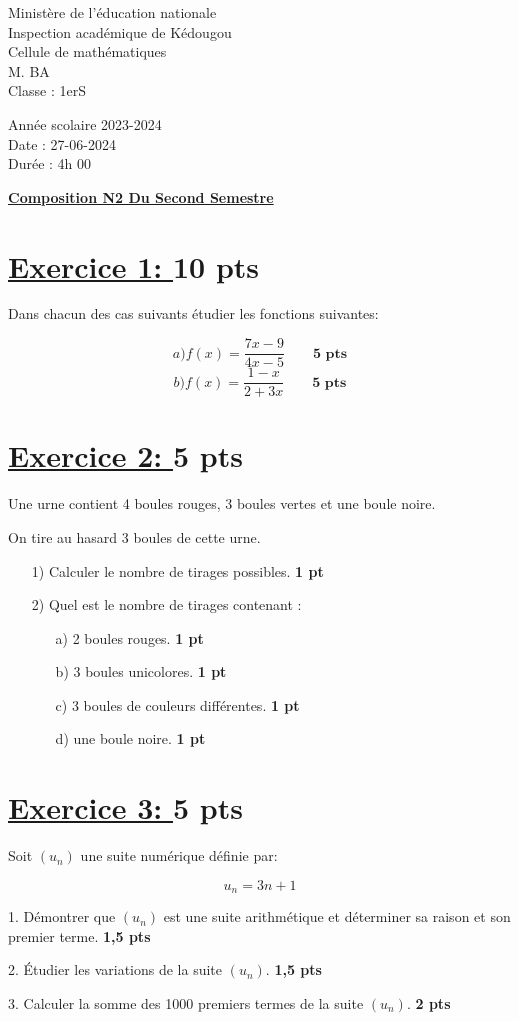 \documentclass[12pt]{article}
\begin{document}
\begin{minipage}{0.5\textwidth}
	Ministère de l'éducation nationale  \\
	Inspection académique de Kédougou   \\
	Cellule de mathématiques            \\
	M. BA\\
	Classe : 1erS
\end{minipage}
\begin{minipage}{0.5\textwidth}
	Année scolaire 2023-2024 \\
	Date : 27-06-2024 \\
	Durée : 4h 00 \\
\end{minipage}

\begin{center}
	\textbf{{\underline{Composition N2 Du Second Semestre}}}
\end{center}
\section*{\underline{Exercice 1: }\textbf{10 pts}}
Dans chacun des cas suivants étudier les fonctions suivantes:

\[a)f(x)=\frac{7x-9}{4x-5}\quad\quad\textbf{5 pts}\]
\[b)f(x)=\frac{1-x}{2+3x}\quad\quad\textbf{5 pts}\]
\section*{\underline{Exercice 2: }\textbf{5 pts}}
Une urne contient 4 boules rouges, 3 boules vertes et une boule noire.

On tire au hasard 3 boules de cette urne.

\begin{itemize}
\item[1)] Calculer le nombre de tirages possibles. \textbf{1 pt}
\item[2)] Quel est le nombre de tirages contenant :
\begin{itemize}
\item[a)] 2 boules rouges. \textbf{1 pt}
\item[b)] 3 boules unicolores. \textbf{1 pt}
\item[c)] 3 boules de couleurs différentes. \textbf{1 pt}
\item[d)] une boule noire. \textbf{1 pt}
\end{itemize}
\end{itemize}

\section*{\underline{Exercice 3: }\textbf{5 pts}}
Soit $(u_n)$ une suite numérique définie par:

\[ u_n = 3n + 1 \]

1. Démontrer que $(u_n)$ est une suite arithmétique et déterminer sa raison et son premier terme. \textbf{1,5 pts}

2. Étudier les variations de la suite $(u_n)$. \textbf{1,5 pts}

3. Calculer la somme des 1000 premiers termes de la suite $(u_n)$. \textbf{2 pts}
\end{document}
